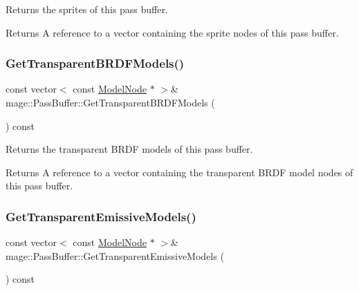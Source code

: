 Returns the sprites of this pass buffer.

\begin{DoxyReturn}{Returns}
A reference to a vector containing the sprite nodes of this pass buffer. 
\end{DoxyReturn}
\hypertarget{structmage_1_1_pass_buffer_a8d21b9d7a68d56c5833f814ce0b6b0db}{}\label{structmage_1_1_pass_buffer_a8d21b9d7a68d56c5833f814ce0b6b0db} 
\subsubsection{\texorpdfstring{Get\+Transparent\+B\+R\+D\+F\+Models()}{GetTransparentBRDFModels()}}
{\footnotesize\ttfamily const vector$<$ const \hyperlink{classmage_1_1_model_node}{Model\+Node} $\ast$ $>$\& mage\+::\+Pass\+Buffer\+::\+Get\+Transparent\+B\+R\+D\+F\+Models (\begin{DoxyParamCaption}{ }\end{DoxyParamCaption}) const\hspace{0.3cm}{\ttfamily [noexcept]}}

Returns the transparent B\+R\+DF models of this pass buffer.

\begin{DoxyReturn}{Returns}
A reference to a vector containing the transparent B\+R\+DF model nodes of this pass buffer. 
\end{DoxyReturn}
\hypertarget{structmage_1_1_pass_buffer_af51d15e8ec6230a6f17644ec2d1b6feb}{}\label{structmage_1_1_pass_buffer_af51d15e8ec6230a6f17644ec2d1b6feb} 
\subsubsection{\texorpdfstring{Get\+Transparent\+Emissive\+Models()}{GetTransparentEmissiveModels()}}
{\footnotesize\ttfamily const vector$<$ const \hyperlink{classmage_1_1_model_node}{Model\+Node} $\ast$ $>$\& mage\+::\+Pass\+Buffer\+::\+Get\+Transparent\+Emissive\+Models (\begin{DoxyParamCaption}{ }\end{DoxyParamCaption}) const\hspace{0.3cm}{\ttfamily [noexcept]}}

